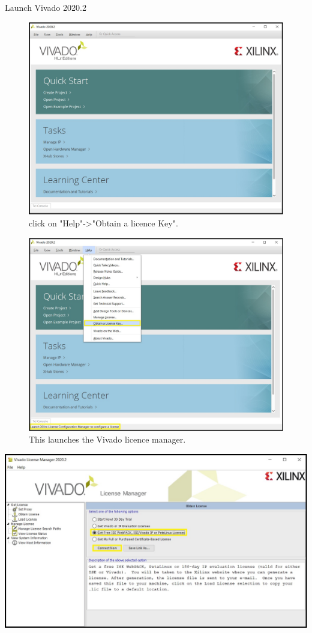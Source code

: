 Launch Vivado 2020.2

\begin{figure}[H]
\centering
  \includegraphics[width=0.8\linewidth]{images/VivadoInstimg021.jpg}
  \captionsetup{width=0.8\linewidth}
  \caption{click on "Help"->"Obtain a licence Key".}
  \label{fig:VivadoInstimg021}
\end{figure}

\begin{figure}[H]
\centering
  \includegraphics[width=0.8\linewidth]{images/VivadoInstimg022.jpg}
  \captionsetup{width=0.8\linewidth}
  \caption{This launches the Vivado licence manager.}
  \label{fig:VivadoInstimg022}
\end{figure}

\includegraphics[width=\linewidth]{images/VivadoInstimg023.jpg}

